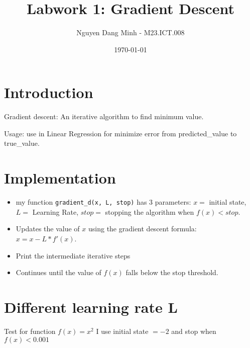 \documentclass{article}
\title{Labwork 1: Gradient Descent}
\author{Nguyen Dang Minh - M23.ICT.008}
\date{\today}
\begin{document}
\maketitle

\section{Introduction}
Gradient descent: An iterative algorithm to find minimum value.

Usage: use in Linear Regression for minimize error from predicted_value to true_value.

\section{Implementation}
\begin{itemize}
\item my function \texttt{gradient\_d(x, L, stop)} has 3 parameters: $x = $ initial state, $L =$ Learning Rate, $stop =$ stopping the algorithm when $f(x)<stop$. 


\item Updates the value of $x$ using the gradient descent formula: $x = x - L * f'(x)$.


\item Print the intermediate iterative steps


\item Continues until the value of $f(x)$ falls below the stop threshold.
\end{itemize}
\section{Different learning rate L}
Test for function $f(x) = x^2$
I use initial state $= -2$ and stop when $f(x) < 0.001$
\end{document}
